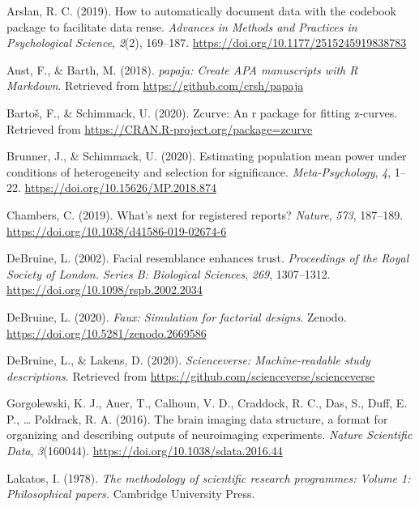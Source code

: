 \documentclass[
  english,
  doc,floatsintext]{apa6}
\begin{document}
\hypertarget{refs}{}
\leavevmode\hypertarget{ref-arslan2019}{}%
Arslan, R. C. (2019). How to automatically document data with the codebook package to facilitate data reuse. \emph{Advances in Methods and Practices in Psychological Science}, \emph{2}(2), 169--187. \url{https://doi.org/10.1177/2515245919838783}

\leavevmode\hypertarget{ref-R-papaja}{}%
Aust, F., \& Barth, M. (2018). \emph{papaja: Create APA manuscripts with R Markdown}. Retrieved from \url{https://github.com/crsh/papaja}

\leavevmode\hypertarget{ref-R-zcurve}{}%
Bartoš, F., \& Schimmack, U. (2020). Zcurve: An r package for fitting z-curves. Retrieved from \url{https://CRAN.R-project.org/package=zcurve}

\leavevmode\hypertarget{ref-brunner2020}{}%
Brunner, J., \& Schimmack, U. (2020). Estimating population mean power under conditions of heterogeneity and selection for significance. \emph{Meta-Psychology}, \emph{4}, 1--22. \url{https://doi.org/10.15626/MP.2018.874}

\leavevmode\hypertarget{ref-chambers2019}{}%
Chambers, C. (2019). What's next for registered reports? \emph{Nature}, \emph{573}, 187--189. \url{https://doi.org/10.1038/d41586-019-02674-6}

\leavevmode\hypertarget{ref-debruine2002}{}%
DeBruine, L. (2002). Facial resemblance enhances trust. \emph{Proceedings of the Royal Society of London. Series B: Biological Sciences}, \emph{269}, 1307--1312. \url{https://doi.org/10.1098/rspb.2002.2034}

\leavevmode\hypertarget{ref-R-faux}{}%
DeBruine, L. (2020). \emph{Faux: Simulation for factorial designs}. Zenodo. \url{https://doi.org/10.5281/zenodo.2669586}

\leavevmode\hypertarget{ref-R-scienceverse}{}%
DeBruine, L., \& Lakens, D. (2020). \emph{Scienceverse: Machine-readable study descriptions}. Retrieved from \url{https://github.com/scienceverse/scienceverse}

\leavevmode\hypertarget{ref-bids2016}{}%
Gorgolewski, K. J., Auer, T., Calhoun, V. D., Craddock, R. C., Das, S., Duff, E. P., \ldots{} Poldrack, R. A. (2016). The brain imaging data structure, a format for organizing and describing outputs of neuroimaging experiments. \emph{Nature Scientific Data}, \emph{3}(160044). \url{https://doi.org/10.1038/sdata.2016.44}

\leavevmode\hypertarget{ref-lakatos1978}{}%
Lakatos, I. (1978). \emph{The methodology of scientific research programmes: Volume 1: Philosophical papers.} Cambridge University Press.
\end{document}
